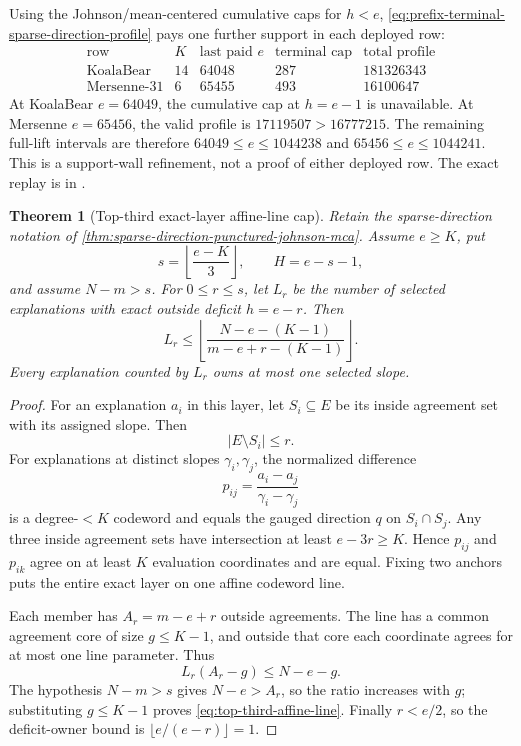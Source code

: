 \documentclass[11pt,a4paper]{amsart}
\numberwithin{equation}{section}
\newtheorem{theorem}{Theorem}[section]
\theoremstyle{remark}
\begin{document}
\begin{remark}
Using the Johnson/mean-centered cumulative caps for \(h<e\),
\eqref{eq:prefix-terminal-sparse-direction-profile} pays one further
support in each deployed row:
\[
\begin{array}{c|c|c|r|r}
\text{row}&K&\text{last paid }e&\text{terminal cap}&\text{total profile}\\ \hline
\text{KoalaBear}&14&64048&287&181326343\\
\text{Mersenne-31}&6&65455&493&16100647
\end{array}
\]
At KoalaBear \(e=64049\), the cumulative cap at \(h=e-1\) is unavailable.
At Mersenne \(e=65456\), the valid profile is
\(17119507>16777215\).  The remaining full-lift intervals are therefore
\(64049\le e\le1044238\) and \(65456\le e\le1044241\).  This is a
support-wall refinement, not a proof of either deployed row.  The exact
replay is in
.
\end{remark}

\begin{theorem}[Top-third exact-layer affine-line cap]
\label{thm:top-third-affine-line}
Retain the sparse-direction notation of
\cref{thm:sparse-direction-punctured-johnson-mca}.  Assume \(e\ge K\), put
\[
 s=\left\lfloor\frac{e-K}{3}\right\rfloor,
 \qquad H=e-s-1,
\]
and assume \(N-m>s\).  For \(0\le r\le s\), let \(L_r\) be the number of
selected explanations with exact outside deficit \(h=e-r\).  Then
\begin{equation}
 L_r\le
 \left\lfloor\frac{N-e-(K-1)}{m-e+r-(K-1)}\right\rfloor.
 \label{eq:top-third-affine-line}
\end{equation}
Every explanation counted by \(L_r\) owns at most one selected slope.
\end{theorem}

\begin{proof}
For an explanation \(a_i\) in this layer, let \(S_i\subseteq E\) be its
inside agreement set with its assigned slope.  Then
\[
 |E\setminus S_i|\le r.
\]
For explanations at distinct slopes \(\gamma_i,\gamma_j\), the normalized
difference
\[
 p_{ij}=\frac{a_i-a_j}{\gamma_i-\gamma_j}
\]
is a degree-\(<K\) codeword and equals the gauged direction \(q\) on
\(S_i\cap S_j\).  Any three inside agreement sets have intersection at
least \(e-3r\ge K\).  Hence \(p_{ij}\) and \(p_{ik}\) agree on at least
\(K\) evaluation coordinates and are equal.  Fixing two anchors puts the
entire exact layer on one affine codeword line.

Each member has \(A_r=m-e+r\) outside agreements.  The line has a common
agreement core of size \(g\le K-1\), and outside that core each coordinate
agrees for at most one line parameter.  Thus
\[
 L_r(A_r-g)\le N-e-g.
\]
The hypothesis \(N-m>s\) gives \(N-e>A_r\), so the ratio increases with
\(g\); substituting \(g\le K-1\) proves
\eqref{eq:top-third-affine-line}.  Finally \(r<e/2\), so the deficit-owner
bound is \(\lfloor e/(e-r)\rfloor=1\).
\end{proof}
\end{document}

